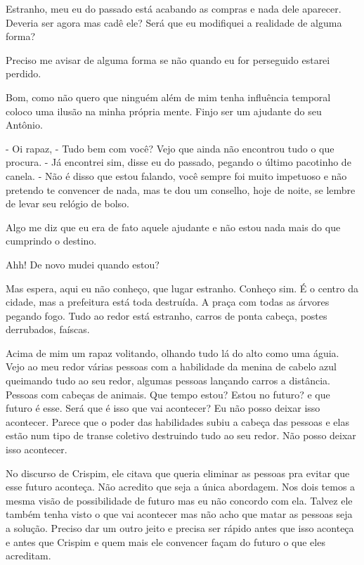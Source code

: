 Estranho, meu eu do passado está acabando as compras e nada dele aparecer. Deveria ser agora mas cadê ele? Será que eu modifiquei a realidade de alguma forma?

Preciso me avisar de alguma forma se não quando eu for perseguido estarei perdido.

Bom, como não quero que ninguém além de mim tenha influência temporal coloco uma ilusão na minha própria mente. Finjo ser um ajudante do seu Antônio.

- Oi rapaz, 
- Tudo bem com você? Vejo que ainda não encontrou tudo o que procura.
- Já encontrei sim, disse eu do passado, pegando o último pacotinho de canela.
- Não é disso que estou falando, você sempre foi muito impetuoso e não pretendo te convencer de nada, mas te dou um conselho, hoje de noite, se lembre de levar seu relógio de bolso.

Algo me diz que eu era de fato aquele ajudante e não estou nada mais do que cumprindo o destino.

Ahh! De novo mudei quando estou?

Mas espera, aqui eu não conheço, que lugar estranho.
Conheço sim. 
É o centro da cidade, mas a prefeitura está toda destruída. A praça com todas as árvores pegando fogo. Tudo ao redor está estranho, carros de ponta cabeça, postes derrubados, faíscas.

Acima de mim um rapaz volitando, olhando tudo lá do alto como uma águia.
Vejo ao meu redor várias pessoas com a habilidade da menina de cabelo azul queimando tudo ao seu redor, algumas pessoas lançando carros a distância. Pessoas com cabeças de animais. 
Que tempo estou? Estou no futuro? e que futuro é esse.
Será que é isso que vai acontecer? Eu não posso deixar isso acontecer. 
Parece que o poder das habilidades subiu a cabeça das pessoas e elas estão num tipo de transe coletivo destruindo tudo ao seu redor. Não posso deixar isso acontecer.

No discurso de Crispim, ele citava que queria eliminar as pessoas pra evitar que esse futuro aconteça. Não acredito que seja a única abordagem. Nos dois temos a mesma visão de possibilidade de futuro mas eu não concordo com ela. 
Talvez ele também tenha visto o que vai acontecer mas não acho que matar as pessoas seja a solução. Preciso dar um outro jeito e precisa ser rápido antes que isso aconteça e antes que Crispim e quem mais ele convencer façam do futuro o que eles acreditam.